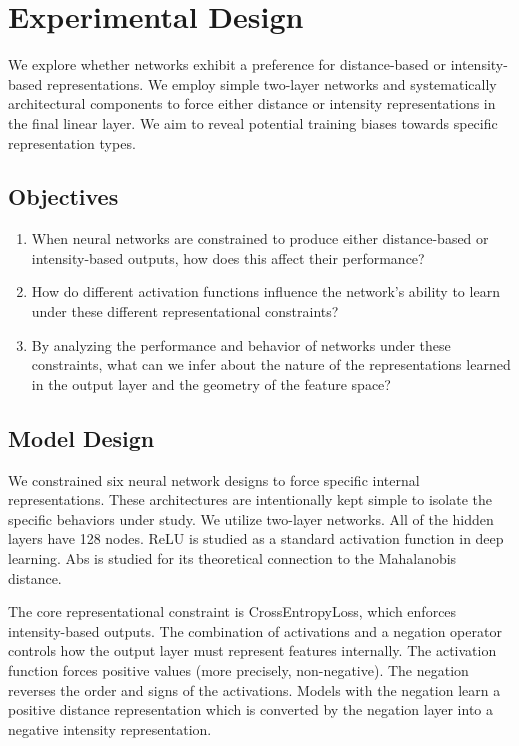 \section{Experimental Design}
\label{sec:exp_design}

We explore whether networks exhibit a preference for distance-based or intensity-based representations. We employ simple two-layer networks and systematically architectural components to force either distance or intensity representations in the final linear layer. We aim to reveal potential training biases towards specific representation types.

\subsection{Objectives}
\begin{enumerate}
    \item When neural networks are constrained to produce either distance-based or intensity-based outputs, how does this affect their performance?
    
    \item How do different activation functions influence the network's ability to learn under these different representational constraints?
    \item By analyzing the performance and behavior of networks under these constraints, what can we infer about the nature of the representations learned in the output layer and the geometry of the feature space?
\end{enumerate}


\subsection{Model Design}

We constrained six neural network designs to force specific internal representations. These architectures are intentionally kept simple to isolate the specific behaviors under study. We utilize two-layer networks. All of the hidden layers have 128 nodes. ReLU is studied as a standard activation function in deep learning. Abs is studied for its theoretical connection to the Mahalanobis distance.

The core representational constraint is CrossEntropyLoss, which enforces intensity-based outputs. The combination of activations and a negation operator controls how the output layer must represent features internally. The activation function forces positive values (more precisely, non-negative). The negation reverses the order and signs of the activations. Models with the negation learn a positive distance representation which is converted by the negation layer into a negative intensity representation. 

